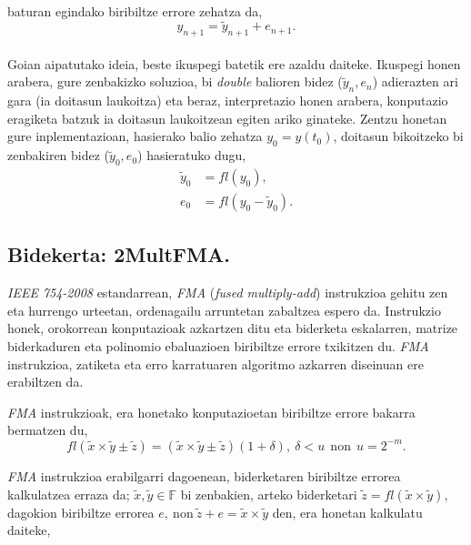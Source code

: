 \paragraph*{}baturan egindako  biribiltze errore zehatza da,
\begin{equation}
y_{n+1}=\tilde {y}_{n+1}+e_{n+1}. 
\end{equation}

\paragraph*{}Goian aipatutako ideia,  beste ikuspegi batetik ere azaldu daiteke. Ikuspegi honen arabera, gure zenbakizko soluzioa, bi \emph{double} balioren bidez ($\tilde{y}_n,e_n$)  adierazten ari gara (ia doitasun laukoitza) eta beraz, interpretazio honen arabera, konputazio eragiketa batzuk ia doitasun laukoitzean egiten ariko ginateke. Zentzu honetan gure inplementazioan, hasierako balio zehatza $y_0=y(t_0)$, doitasun bikoitzeko bi zenbakiren bidez ($\tilde{y}_0, e_0$) hasieratuko dugu,
\begin{align*}
\tilde{y}_0 &=fl(y_0) ,\\
e_0 &=fl(y_0-\tilde{y}_0).
\end{align*}

\subsection*{Bidekerta: 2MultFMA.}

\emph{IEEE 754-2008} estandarrean, \emph{FMA} (\emph{fused multiply-add}) instrukzioa gehitu zen eta hurrengo urteetan, ordenagailu arruntetan zabaltzea espero da. Instrukzio honek, orokorrean konputazioak azkartzen ditu eta biderketa eskalarren, matrize biderkaduren eta polinomio ebaluazioen biribiltze errore txikitzen du. \emph{FMA} instrukzioa, zatiketa eta erro karratuaren algoritmo azkarren diseinuan ere erabiltzen da.


\emph{FMA} instrukzioak, era honetako konputazioetan biribiltze errore bakarra bermatzen du,
\begin{equation*}
fl(\tilde x \times \tilde y \pm \tilde z)= (\tilde x \times \tilde y\pm \tilde z) (1+\delta), \ \delta<u \ \ \text{non} \ \ u=2^{-m}.
\end{equation*}
 

\emph{FMA}  instrukzioa erabilgarri dagoenean, biderketaren biribiltze errorea kalkulatzea erraza da; $\tilde x,\tilde y \in \mathbb{F}$ bi zenbakien, arteko biderketari $\tilde z= fl(\tilde x \times \tilde y)$,  dagokion biribiltze errorea $e, \ \text{non} \  \tilde{z}+ e=\tilde x \times \tilde y$ den, era honetan kalkulatu daiteke,

